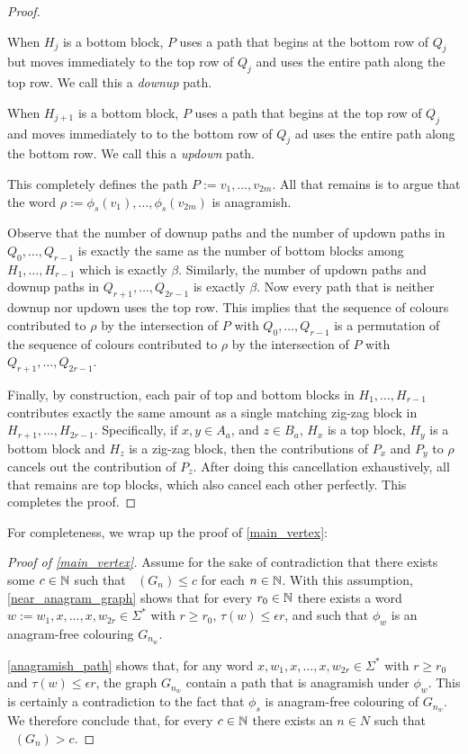 \documentclass{patmorin}
\DeclareMathOperator{\afcn}{\dot{\chi}_\pi}
\begin{document}
\begin{proof}
    \begin{compactenum}
        \item When $H_j$ is a bottom block, $P$ uses a path that begins at the bottom row of $Q_j$ but moves immediately to the top row of $Q_j$ and uses the entire path along the top row. We call this a \emph{downup} path.
        \item When $H_{j+1}$ is a bottom block, $P$ uses a path that begins at the top row of $Q_j$ and moves immediately to to the bottom row of $Q_j$ ad uses the entire path along the bottom row.  We call this a \emph{updown} path.
    \end{compactenum}
    This completely defines the path $P:=v_1,\ldots,v_{2m}$. All that remains is to argue that the word $\rho:=\phi_s(v_1),\ldots,\phi_s(v_{2m})$ is anagramish.

    Observe that the number of downup paths and the number of updown paths in $Q_0,\ldots,Q_{r-1}$ is exactly the same as the number of bottom blocks among $H_1,\ldots,H_{r-1}$ which is exactly $\beta$.  Similarly, the number of updown paths and downup paths in $Q_{r+1},\ldots,Q_{2r-1}$ is exactly $\beta$.  Now every path that is neither downup nor updown uses the top row.  This implies that the sequence of colours contributed to $\rho$ by  the intersection of $P$ with $Q_0,\ldots,Q_{r-1}$ is a permutation of the sequence of colours contributed to $\rho$ by the intersection of $P$ with $Q_{r+1},\ldots,Q_{2r-1}$.

    Finally, by construction, each pair of top and bottom blocks in $H_1,\ldots,H_{r-1}$ contributes exactly the same amount as a single matching zig-zag block in $H_{r+1},\ldots,H_{2r-1}$.  Specifically, if $x,y\in A_a$, and $z\in B_a$, $H_x$ is a top block, $H_y$ is a bottom block and $H_z$ is a zig-zag block, then the contributions of $P_x$ and $P_y$ to $\rho$ cancels out the contribution of $P_z$. After doing this cancellation exhaustively, all that remains are top blocks, which also cancel each other perfectly.  This completes the proof.
\end{proof}


For completeness, we wrap up the proof of \cref{main_vertex}:

\begin{proof}[Proof of \cref{main_vertex}]
    Assume for the sake of contradiction that there exists some $c\in\mathbb{N}$ such that $\afcn(G_n)\le c$ for each $n\in\mathbb{N}$.  With this assumption, \cref{near_anagram_graph} shows that for every $r_0\in\mathbb{N}$ there exists a word $w:=w_1,x,\ldots,x,w_{2r}\in\Sigma^*$ with $r\ge r_0$, $\tau(w)\le\epsilon r$, and such that $\phi_w$ is an anagram-free colouring $G_{n_w}$.

    \cref{anagramish_path} shows that, for any word $x,w_1,x,\ldots,x,w_{2r}\in\Sigma^*$ with $r\ge r_0$ and $\tau(w)\le\epsilon r$, the graph $G_{n_w}$ contain a path that is anagramish under $\phi_w$.  This is certainly a contradiction to the fact that $\phi_s$ is anagram-free colouring of $G_{n_w}$. We therefore conclude that, for every $c\in\mathbb{N}$ there exists an $n\in N$ such that $\afcn(G_n)> c$.
\end{proof}
\end{document}
